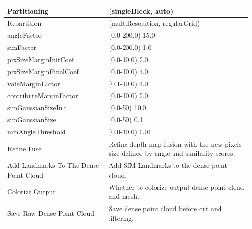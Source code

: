 \documentclass[12pt]{report}
\begin{document}
\begin{table}[h!]
{\begin{tabular}{|l|l|}
  Partitioning                              & (singleBlock, auto)                                                                      \\ \hline
  Repartition                               & (multiResolution, regularGrid)                                                           \\ \hline
  angleFactor                               & (0.0-200.0) 15.0                                                                         \\ \hline
  simFactor                                 & (0.0-200.0) 1.0                                                                          \\ \hline
  pixSizeMarginInitCoef                     & (0.0-10.0) 2.0                                                                           \\ \hline
  pixSizeMarginFinalCoef                    & (0.0-10.0) 4.0                                                                           \\ \hline
  voteMarginFactor                          & (0.1-10.0) 4.0                                                                           \\ \hline
  contributeMarginFactor                    & (0.0-10.0) 2.0                                                                           \\ \hline
  simGaussianSizeInit                       & (0.0-50) 10.0                                                                            \\ \hline
  simGaussianSize                           & (0.0-50) 0.1                                                                             \\ \hline
  minAngleThreshold                         & (0.0-10.0) 0.01                                                                          \\ \hline
  Refine Fuse                               & Refine depth map fusion with the new pixels size defined by angle and similarity scores. \\ \hline
  Add Landmarks To The Dense Point Cloud    & Add SfM Landmarks to the dense point cloud.                                              \\ \hline
  Colorize Output                           & Whether to colorize output dense point cloud and mesh.                                   \\ \hline
  Save Raw Dense Point Cloud                & Save dense point cloud before cut and filtering.                                         \\ \hline

\end{tabular}}
\end{table}
\end{document}
